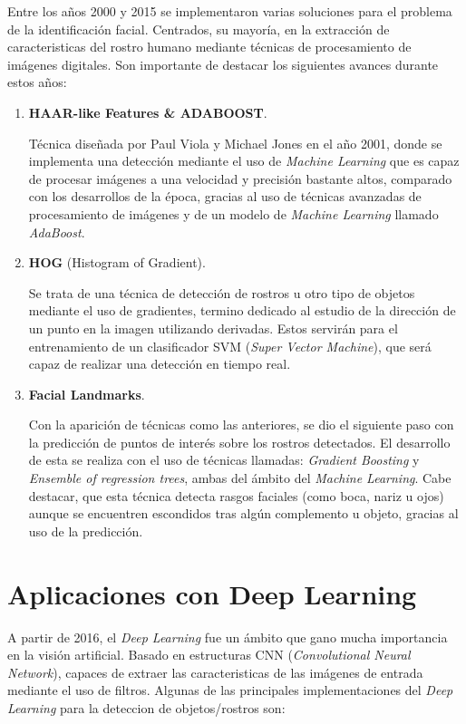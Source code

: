 Entre los años 2000 y 2015 se implementaron varias soluciones para el problema de la identificación facial. Centrados, su mayoría, en la extracción de caracteristicas del rostro humano mediante técnicas de procesamiento de imágenes digitales. Son importante de destacar los siguientes avances durante estos años:

\begin{enumerate}
	\item \textbf{HAAR-like Features \& ADABOOST}.
	
	Técnica diseñada por Paul Viola y Michael Jones en el año 2001, donde se implementa una detección mediante el uso de \textit{Machine Learning} que es capaz de procesar imágenes a una velocidad y precisión bastante altos, comparado con los desarrollos de la época, gracias al uso de técnicas avanzadas de procesamiento de imágenes y de un modelo de \textit{Machine Learning} llamado \textit{AdaBoost}. \cite{paulViola}
	
	\item \textbf{HOG} (Histogram of Gradient).
	
	Se trata de una técnica de detección de rostros u otro tipo de objetos mediante el uso de gradientes, termino dedicado al estudio de la dirección de un punto en la imagen utilizando derivadas. Estos servirán para el entrenamiento de un clasificador SVM (\textit{Super Vector Machine}), que será capaz de realizar una detección en tiempo real.
	
	\item \textbf{Facial Landmarks}.
	
	Con la aparición de técnicas como las anteriores, se dio el siguiente paso con la predicción de puntos de interés sobre los rostros detectados. El desarrollo de esta se realiza con el uso de técnicas llamadas: \textit{Gradient Boosting} y \textit{Ensemble of regression trees}, ambas del ámbito del \textit{Machine Learning}. \cite{faceLandmark} Cabe destacar, que esta técnica detecta rasgos faciales (como boca, nariz u ojos) aunque se encuentren escondidos tras algún complemento u objeto, gracias al uso de la predicción.
\end{enumerate}


\section{Aplicaciones con Deep Learning}

A partir de 2016, el \textit{Deep Learning} fue un ámbito que gano mucha importancia en la visión artificial. Basado en estructuras CNN (\textit{Convolutional Neural Network}), capaces de extraer las caracteristicas de las imágenes de entrada mediante el uso de filtros. Algunas de las principales implementaciones del \textit{Deep Learning} para la deteccion de objetos/rostros son:

